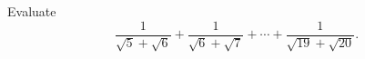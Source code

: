 Evaluate
\[\dfrac{1}{\sqrt5+\sqrt6}+\dfrac{1}{\sqrt6+\sqrt7}+\cdots+\dfrac{1}{\sqrt{19}+\sqrt{20}}.\]
